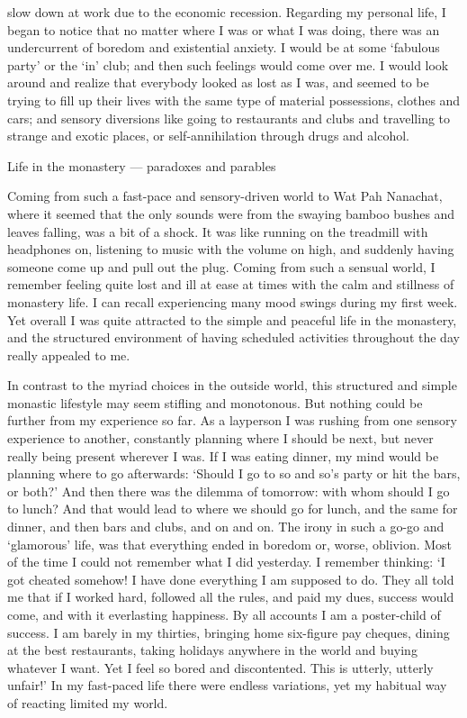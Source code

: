 slow down at work due to the economic recession. Regarding my personal
life, I began to notice that no matter where I was or what I was doing,
there was an undercurrent of boredom and existential anxiety. I would be
at some `fabulous party' or the `in' club; and then such feelings would
come over me. I would look around and realize that everybody looked as
lost as I was, and seemed to be trying to fill up their lives with the
same type of material possessions, clothes and cars; and sensory
diversions like going to restaurants and clubs and travelling to strange
and exotic places, or self-annihilation through drugs and alcohol.

Life in the monastery --- paradoxes and parables

Coming from such a fast-pace and sensory-driven world to Wat Pah
Nanachat, where it seemed that the only sounds were from the swaying
bamboo bushes and leaves falling, was a bit of a shock. It was like
running on the treadmill with headphones on, listening to music with the
volume on high, and suddenly having someone come up and pull out the
plug. Coming from such a sensual world, I remember feeling quite lost
and ill at ease at times with the calm and stillness of monastery life.
I can recall experiencing many mood swings during my first week. Yet
overall I was quite attracted to the simple and peaceful life in the
monastery, and the structured environment of having scheduled activities
throughout the day really appealed to me.

In contrast to the myriad choices in the outside world, this structured
and simple monastic lifestyle may seem stifling and monotonous. But
nothing could be further from my experience so far. As a layperson I was
rushing from one sensory experience to another, constantly planning
where I should be next, but never really being present wherever I was.
If I was eating dinner, my mind would be planning where to go
afterwards: `Should I go to so and so's party or hit the bars, or both?'
And then there was the dilemma of tomorrow: with whom should I go to
lunch? And that would lead to where we should go for lunch, and the same
for dinner, and then bars and clubs, and on and on. The irony in such a
go-go and `glamorous' life, was that everything ended in boredom or,
worse, oblivion. Most of the time I could not remember what I did
yesterday. I remember thinking: `I got cheated somehow! I have done
everything I am supposed to do. They all told me that if I worked hard,
followed all the rules, and paid my dues, success would come, and with
it everlasting happiness. By all accounts I am a poster-child of
success. I am barely in my thirties, bringing home six-figure pay
cheques, dining at the best restaurants, taking holidays anywhere in the
world and buying whatever I want. Yet I feel so bored and discontented.
This is utterly, utterly unfair!' In my fast-paced life there were
endless variations, yet my habitual way of reacting limited my world.

